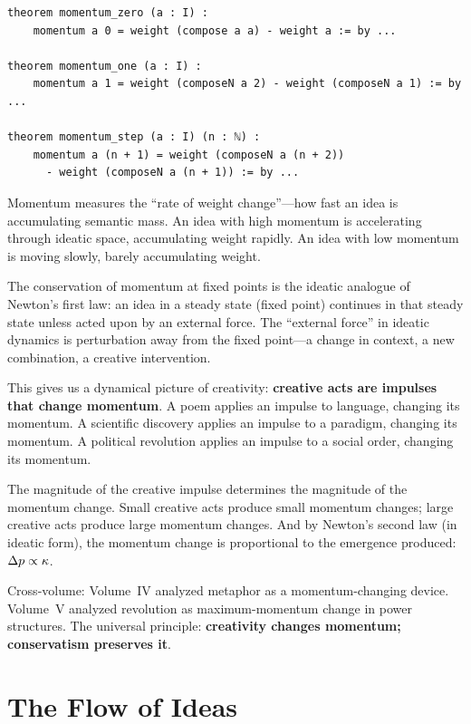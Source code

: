 \begin{lstlisting}[caption={Momentum conservation (IDT\_v3\_Emergence.lean)}]
theorem momentum_zero (a : I) :
    momentum a 0 = weight (compose a a) - weight a := by ...

theorem momentum_one (a : I) :
    momentum a 1 = weight (composeN a 2) - weight (composeN a 1) := by ...

theorem momentum_step (a : I) (n : ℕ) :
    momentum a (n + 1) = weight (composeN a (n + 2))
      - weight (composeN a (n + 1)) := by ...
\end{lstlisting}

\begin{interpretation}
Momentum measures the ``rate of weight change''---how fast an idea is
accumulating semantic mass. An idea with high momentum is accelerating through
ideatic space, accumulating weight rapidly. An idea with low momentum is
moving slowly, barely accumulating weight.

The conservation of momentum at fixed points is the ideatic analogue of
Newton's first law: an idea in a steady state (fixed point) continues in that
steady state unless acted upon by an external force. The ``external force''
in ideatic dynamics is perturbation away from the fixed point---a change in
context, a new combination, a creative intervention.

This gives us a dynamical picture of creativity: \textbf{creative acts are
impulses that change momentum}. A poem applies an impulse to language,
changing its momentum. A scientific discovery applies an impulse to a paradigm,
changing its momentum. A political revolution applies an impulse to a social
order, changing its momentum.

The magnitude of the creative impulse determines the magnitude of the momentum
change. Small creative acts produce small momentum changes; large creative
acts produce large momentum changes. And by Newton's second law (in ideatic
form), the momentum change is proportional to the emergence produced: $\Delta
p \propto \kappa$.

Cross-volume: Volume~IV analyzed metaphor as a momentum-changing device.
Volume~V analyzed revolution as maximum-momentum change in power structures.
The universal principle: \textbf{creativity changes momentum; conservatism
preserves it}.
\end{interpretation}


\section{The Flow of Ideas}

